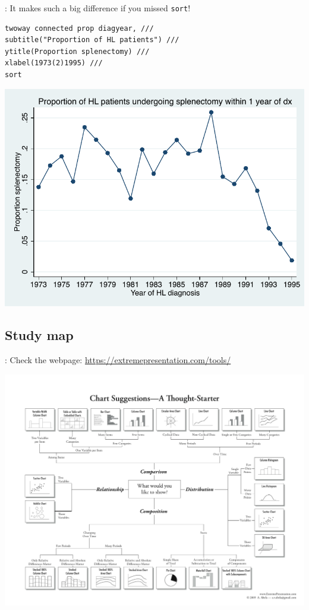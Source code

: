 \begin{frame}[fragile]{\secname: \subsecname}
It makes such a big difference if you missed \verb|sort|!

\small
\begin{verbatim}
twoway connected prop diagyear, ///
subtitle("Proportion of HL patients") ///
ytitle(Proportion splenectomy) ///
xlabel(1973(2)1995) ///
sort	
\end{verbatim}
\begin{center}
	\includegraphics[scale=0.4]{images/sort}
\end{center}

\end{frame}
\subsection{Study map}
\begin{frame}{\secname: \subsecname}
Check the webpage: \url{https://extremepresentation.com/tools/}

\begin{center}
	\includegraphics[scale=0.35]{images/chart}
\end{center}


\end{frame}

